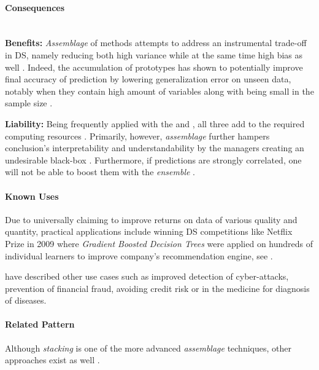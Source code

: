 \paragraph*{Consequences} ~\\
{\hspace*{14.5pt} \textbf{Benefits:} \hspace*{-5.5pt} }
\emph{Assemblage} of methods attempts to address an instrumental trade-off in \ac{DS}, namely reducing both high variance while at the same time high bias as well \parencite{JakeVanderPlas2016PythonHandbook}. 
Indeed, the accumulation of prototypes has shown to potentially improve final accuracy of prediction by lowering generalization error on unseen data, notably when they contain high amount of variables along with being small in the sample size \parencites{NinaBookR2014}{EnsambleBioinf2010}.

\textbf{Liability:}
Being frequently applied with the  and , all three add to the required computing resources \parencite{EnsembleML2012}. 
Primarily, however, \emph{assemblage} further hampers conclusion's interpretability and understandability by the managers creating an undesirable black-box \parencite{PeterETHZ2012}.
Furthermore, if predictions are strongly correlated, one will not be able to boost them with the \emph{ensemble} \parencite{FosterProvost2013DataThinking}. 

\paragraph*{Known Uses}
\begin{compactitem}
  \item Due to universally claiming to improve returns on data of various quality and quantity, practical applications include winning \ac{DS} competitions like Netflix Prize in 2009 where \emph{Gradient Boosted Decision Trees} were applied on hundreds of individual learners to improve company's recommendation engine, see \textcite{Netflix2009}.
  \item \textcites{GranaMichal2014}{NagiSajid2013} have described other use cases such as improved detection of cyber-attacks, prevention of financial fraud, avoiding credit risk or in the medicine for diagnosis of diseases.
\end{compactitem}

\paragraph*{Related Pattern}
Although \emph{stacking} is one of the more advanced \emph{assemblage} techniques, other approaches exist as well \parencite{SAS2016}. 

